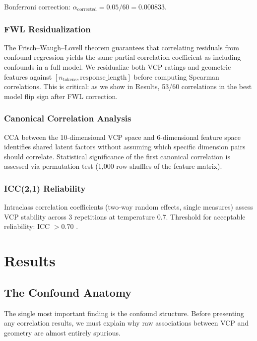 \documentclass[11pt,a4paper]{article}
\begin{document}
Bonferroni correction: $\alpha_{\text{corrected}} = 0.05 / 60 = 0.000833$.

\subsubsection{FWL Residualization}

The Frisch--Waugh--Lovell theorem guarantees that correlating residuals from confound regression yields the same partial correlation coefficient as including confounds in a full model. We residualize both VCP ratings and geometric features against $[n_{\text{tokens}}, \text{response\_length}]$ before computing Spearman correlations. This is critical: as we show in Results, 53/60 correlations in the best model flip sign after FWL correction.

\subsubsection{Canonical Correlation Analysis}

CCA between the 10-dimensional VCP space and 6-dimensional feature space identifies shared latent factors without assuming which specific dimension pairs should correlate. Statistical significance of the first canonical correlation is assessed via permutation test (1,000 row-shuffles of the feature matrix).

\subsubsection{ICC(2,1) Reliability}

Intraclass correlation coefficients (two-way random effects, single measures) assess VCP stability across 3 repetitions at temperature 0.7. Threshold for acceptable reliability: ICC $> 0.70$ \citep{koo2016guideline}.

\section{Results}

\subsection{The Confound Anatomy}

The single most important finding is the confound structure. Before presenting any correlation results, we must explain why raw associations between VCP and geometry are almost entirely spurious.
\end{document}
